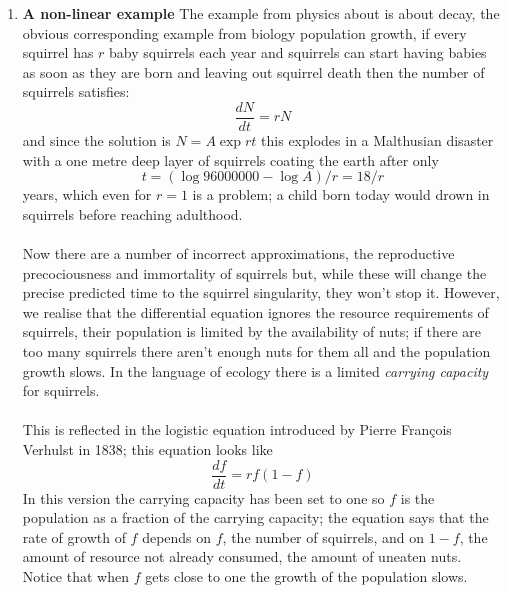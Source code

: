 \documentclass[11pt,a4paper]{scrartcl}
\begin{document}
\begin{enumerate}
        
        \item \textbf{A non-linear example} The example from physics
          about is about decay, the obvious corresponding example from
          biology population growth, if every squirrel has $r$ baby
          squirrels each year and squirrels can start having babies as
          soon as they are born and leaving out squirrel death then
          the number of squirrels satisfies:
          \begin{equation}
            \frac{dN}{dt}=rN
          \end{equation}
          and since the solution is $N=A\exp{rt}$ this explodes in a
          Malthusian disaster with a one metre deep layer of squirrels coating the earth after only
          \begin{equation}
            t=(\log{96000000}-\log{A})/r=18/r
          \end{equation}
          years, which even for $r=1$ is a problem; a child born today
          would drown in squirrels before reaching adulthood.\\ \\ Now
          there are a number of incorrect approximations, the
          reproductive precociousness and immortality of squirrels
          but, while these will change the precise predicted time to
          the squirrel singularity, they won't stop it. However, we
          realise that the differential equation ignores the resource
          requirements of squirrels, their population is limited by
          the availability of nuts; if there are too many squirrels
          there aren't enough nuts for them all and the population
          growth slows. In the language of ecology there is a limited
          \textsl{carrying capacity} for squirrels.\\
          \\
          This is reflected in the logistic equation introduced by Pierre Fran\c{c}ois Verhulst in 1838; this equation looks like
          \begin{equation}
            \frac{df}{dt}=rf(1-f)
          \end{equation}
In this version the carrying capacity has been set to one so $f$ is
the population as a fraction of the carrying capacity; the equation
says that the rate of growth of $f$ depends on $f$, the number of
squirrels, and on $1-f$, the amount of resource not already consumed,
the amount of uneaten nuts. Notice that when $f$ gets close to one the
growth of the population slows.\\

\end{enumerate}
\end{document}
